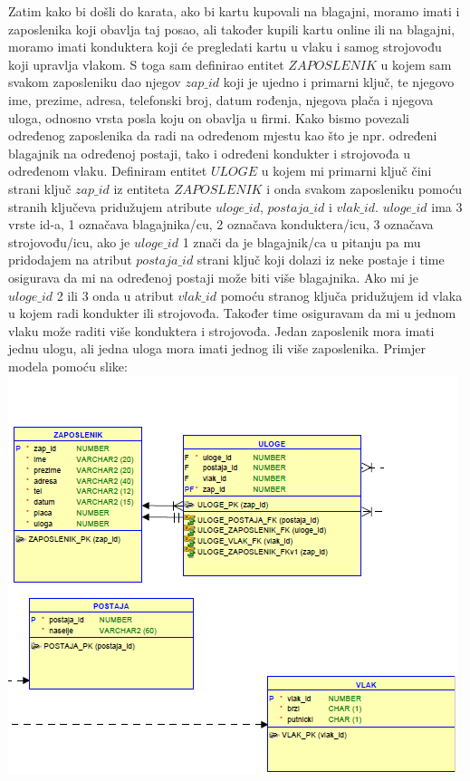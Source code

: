\documentclass{OM_style}
\begin{document}
Zatim kako bi došli do karata, ako bi kartu kupovali na blagajni, moramo imati i zaposlenika koji obavlja taj posao, ali također kupili kartu online ili na blagajni, moramo imati konduktera koji će pregledati kartu u vlaku i samog strojovođu koji upravlja vlakom. S toga sam definirao entitet $ZAPOSLENIK$ u kojem sam svakom zaposleniku dao njegov $zap\_id$ koji je ujedno i primarni ključ, te njegovo ime, prezime, adresa, telefonski broj, datum rođenja, njegova plača i njegova uloga, odnosno vrsta posla koju on obavlja u firmi. Kako bismo povezali određenog zaposlenika da radi na određenom mjestu kao što je npr. određeni blagajnik na određenoj postaji, tako i određeni kondukter i strojovođa u određenom vlaku. Definiram entitet $ULOGE$ u kojem mi primarni ključ čini strani ključ $zap\_id$ iz entiteta $ZAPOSLENIK$ i onda svakom zaposleniku pomoću stranih ključeva pridužujem atribute $uloge\_id$, $postaja\_id$ i $vlak\_id$. $uloge\_id$ ima 3 vrste id-a, 1 označava blagajnika/cu, 2 označava konduktera/icu, 3 označava strojovođu/icu, ako je $uloge\_id$ 1 znači da je blagajnik/ca u pitanju pa mu pridodajem na atribut $postaja\_id$ strani ključ koji dolazi iz neke postaje i time osigurava da mi na određenoj postaji može biti više blagajnika. Ako mi je $uloge\_id$ 2 ili 3 onda u atribut $vlak\_id$ pomoću stranog ključa pridužujem id vlaka u kojem radi kondukter ili strojovođa. Također time osiguravam da mi u jednom vlaku može raditi više konduktera i strojovođa. Jedan zaposlenik mora imati jednu ulogu, ali jedna uloga mora imati jednog ili više zaposlenika. Primjer modela pomoću slike: \\

\phantom{...........} \includegraphics{zapuloga} \\
\end{document}
